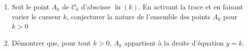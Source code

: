 \begin{exercice_cours}[\quad]{}
\begin{enumerate}
	Justifier que dans ce cas, les fonctions $f_k$ admettent un minimum sur $\R$ atteint en $x=\ln(k)$
	
	\item Soit le point $A_k$ de $\mathcal{C}_k$ d'abscisse $\ln(k)$. En activant la trace et en faisant varier le curseur $k$, conjecturer la nature de l'ensemble des points $A_k$ pour $k>0$
	
	\item Démontrer que, pour tout $k>0$, $A_k$ appartient à la droite d'équation $y=k$.
\end{enumerate}

\end{exercice_cours}

\medskip

\begin{exercice_cours}[\quad]{}

	
\end{exercice_cours}